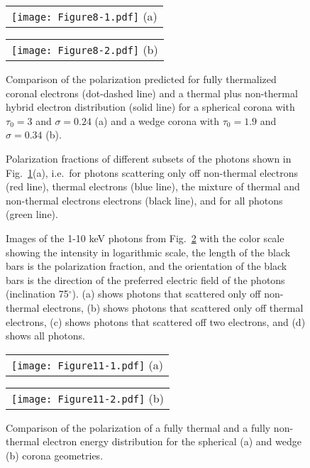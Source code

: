 \documentclass[manuscript]{aastex}
\begin{document}
\begin{figure}
  \centering
 \begin{tabular}[b]{@{}p{}@{}}
    \centering\texttt{[image: Figure8-1.pdf]} 
    \centering\small (a)
  \end{tabular}%
  \quad
  \begin{tabular}[b]{@{}p{}@{}}
    \centering\texttt{[image: Figure8-2.pdf]} 
    \centering\small (b)
  \end{tabular}
  \caption{Comparison of the polarization predicted for fully thermalized coronal electrons (dot-dashed line) and a thermal plus non-thermal hybrid electron distribution (solid line) for a  spherical corona with $\tau_0=3$ and $\sigma=0.24$ (a) and a wedge corona with $\tau_0=1.9$ and  $\sigma=0.34$ (b).} \label{nonthfrac}
\end{figure}

\begin{figure}
\caption{Polarization fractions of different subsets of the photons shown in Fig.~\ref{nonthfrac}(a), i.e.\ 
for photons scattering only off non-thermal electrons (red line), thermal electrons (blue line), the mixture of thermal and non-thermal electrons electrons (black line), and for all photons (green line).
 }
\label{3cont}
\end{figure}

\begin{figure}
\caption{Images of the 1-10 keV photons from Fig.~\ref{3cont} with the color scale showing the intensity in logarithmic scale, 
the length of the black bars is the polarization fraction, and the orientation of the black bars is the direction of the 
preferred electric field of the photons (inclination 75$^{\circ}$). (a) shows photons that scattered only
 off non-thermal electrons, (b) shows photons that scattered only off thermal electrons, (c) shows photons that scattered 
 off two electrons, and (d) shows all photons. }
\label{3contimage}
\end{figure}

\begin{figure}
  \centering
 \begin{tabular}[b]{@{}p{}@{}}
    \centering\texttt{[image: Figure11-1.pdf]} 
    \centering\small (a)
  \end{tabular}%
  \quad
  \begin{tabular}[b]{@{}p{}@{}}
    \centering\texttt{[image: Figure11-2.pdf]} 
    \centering\small (b)
  \end{tabular}
  \caption{Comparison of the polarization of a fully thermal and a fully non-thermal electron energy distribution  for the  spherical (a) and wedge (b) corona geometries.} \label{allnonthpol}
\end{figure}
\end{document}
